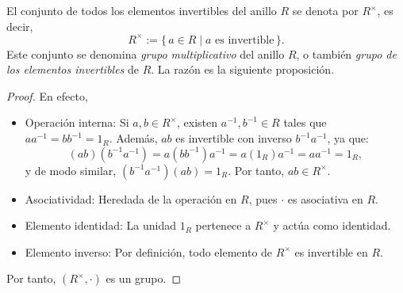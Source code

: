 \begin{observacion}
\end{observacion}
 
 
 El conjunto de todos los elementos invertibles del anillo \( R \) se denota por \( R^\times \), es decir,
 \[
 R^\times := \{ \, a \in R \mid a \text{ es invertible} \, \}.
 \]
 Este conjunto se denomina \textit{grupo multiplicativo} del anillo \( R \), o también \textit{grupo de los elementos invertibles} de \( R \). La razón es la siguiente proposición.
 
 \begin{proposicion}
 \end{proposicion}
 
\begin{proof}
	En efecto,
	\begin{itemize}
		\item Operación interna: Si \( a, b \in R^\times \), existen \( a^{-1}, b^{-1} \in R \) tales que \( a a^{-1} = b b^{-1} = 1_R \). Además, \( ab \) es invertible con inverso \( b^{-1} a^{-1} \), ya que:
		\[
		(ab)(b^{-1} a^{-1}) = a (b b^{-1}) a^{-1} = a (1_R) a^{-1} = a a^{-1} = 1_R,
		\]
		y de modo similar, \( (b^{-1} a^{-1})(ab) = 1_R \). Por tanto, \( ab \in R^\times \).
		
		\item Asociatividad: Heredada de la operación en \( R \), pues \( \cdot \) es asociativa en \( R \).
		
		\item Elemento identidad: La unidad \( 1_R \) pertenece a \( R^\times \) y actúa como identidad.
		
		\item Elemento inverso: Por definición, todo elemento de \( R^\times \) es invertible en \( R \).
	\end{itemize}
	Por tanto, \( \left( R^\times, \cdot \right) \) es un grupo.
\end{proof}

\begin{ejemplo}
\end{ejemplo}

